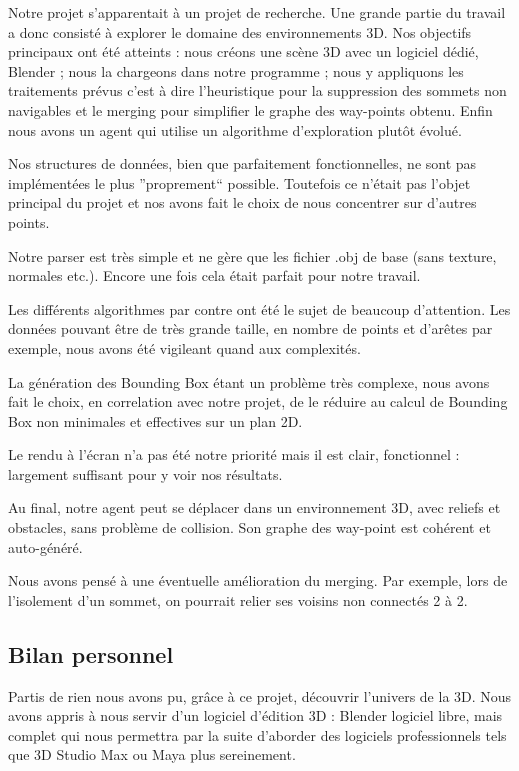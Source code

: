 \documentclass[a4paper,12pt]{report}
\begin{document}
Notre projet s'apparentait à un projet de recherche. Une grande partie du travail a donc consisté à explorer le domaine des environnements 3D. Nos objectifs principaux ont été atteints : nous créons une scène 3D avec un logiciel dédié, Blender ; nous la chargeons dans notre programme ; nous y appliquons les traitements prévus c'est à dire l'heuristique pour la suppression des sommets non navigables et le merging pour simplifier le graphe des way-points obtenu. Enfin nous avons un agent qui utilise un algorithme d'exploration plutôt évolué.

Nos structures de données, bien que parfaitement fonctionnelles, ne sont pas implémentées le plus ''proprement`` possible. Toutefois ce n'était pas l'objet principal du projet et nos avons fait le choix de nous concentrer sur d'autres points.

Notre parser est très simple et ne gère que les fichier .obj de base (sans texture, normales etc.). Encore une fois cela était parfait pour notre travail.

Les différents algorithmes par contre ont été le sujet de beaucoup d'attention. Les données pouvant être de très grande taille, en nombre de points et d'arêtes par exemple, nous avons été vigileant quand aux complexités.

La génération des Bounding Box étant un problème très complexe, nous avons fait le choix, en correlation avec notre projet, de le réduire au calcul de Bounding Box non minimales et effectives sur un plan 2D.

Le rendu à l'écran n'a pas été notre priorité mais il est clair, fonctionnel : largement suffisant pour y voir nos résultats.

Au final, notre agent peut se déplacer dans un environnement 3D, avec reliefs et obstacles, sans problème de collision. Son graphe des way-point est cohérent et auto-généré.

Nous avons pensé à une éventuelle amélioration du merging. Par exemple, lors de l'isolement d'un sommet, on pourrait relier ses voisins non connectés 2 à 2.

\newpage

\subsection*{Bilan personnel}
Partis de rien nous avons pu, grâce à ce projet, découvrir l'univers de la 3D. Nous avons appris à nous servir d'un logiciel d'édition 3D : Blender logiciel libre, mais complet qui nous permettra par la suite d'aborder des logiciels professionnels tels que 3D Studio Max ou Maya plus sereinement. 
\end{document}
